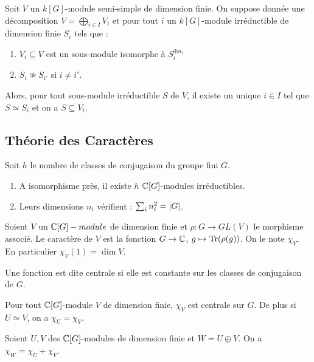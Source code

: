 \documentclass{cours}
\begin{document}
\begin{proposition}
    Soit $V$ un $k[G]$-module semi-simple de dimension finie. On suppose donnée une décomposition $V = \bigoplus_{i \in I} V_{i}$ et pour tout $i$ un $k[G]$-module irréductible de dimension finie $S_{i}$ tels que :
    \begin{enumerate}
        \item $V_{i} \subseteq V$ est un sous-module isomorphe à $S_{i}^{\oplus n_{i}}$
        \item $S_{i} \not \simeq S_{i'}$ si $i \neq i'$.
    \end{enumerate}
    Alors, pour tout sous-module irréductible $S$ de $V$, il existe un unique $i \in I$ tel que $S \simeq S_{i}$ et on a $S \subseteq V_{i}$.
\end{proposition}

\subsection{Théorie des Caractères}
\begin{theorem}
    Soit $h$ le nombre de classes de conjugaison du groupe fini $G$.
    \begin{enumerate}
        \item A isomorphisme près, il existe $h$ $\mathbb{C}[G]$-modules irréductibles.
        \item Leurs dimensions $n_{i}$ vérifient : $\sum_{i} n_{i}^{2} = \left|G\right|$.
    \end{enumerate}
\end{theorem}

\begin{definition}
    Soient $V$ un $\mathbb{C}[G]-module$ de dimension finie et $\rho : G \rightarrow GL(V)$ le morphisme associé. Le caractère de $V$ est la fonction $G \to \mathbb{C}$, $g \mapsto \operatorname{Tr}(\rho(g))$. On le note $\chi_{V}$. En particulier $\chi_{V}(1) = \dim V$.
\end{definition}

\begin{definition}
    Une fonction est dite centrale si elle est constante sur les classes de conjugaison de $G$.
\end{definition}

\begin{proposition}
    Pour tout $\mathbb{C}[G]$-module $V$ de dimension finie, $\chi_{V}$ est centrale sur $G$. De plus si $U \simeq V$, on a $\chi_{U} = \chi_{V}$.
\end{proposition}

\begin{proposition}
    Soient $U, V$ des $\mathbb{C}[G]$-modules de dimension finie et $W = U \oplus V$. On a $\chi_{W} = \chi_{U} + \chi_{V}$.
\end{proposition}
\end{document}
